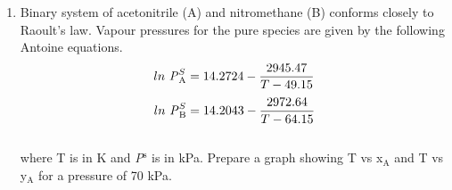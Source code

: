 \documentclass[a4paper,12pt]{report}
\begin{document}
\begin{enumerate}
    
    \item Binary system of acetonitrile (A) and nitromethane (B) conforms closely to Raoult's law. Vapour pressures for the pure species are given by the following Antoine equations.
    $$ln \  \text{\textit{P}}_\text{A}^S = 14.2724 - \frac{2945.47}{T-49.15}$$
    $$ ln \  \text{\textit{P}}_\text{B}^S = 14.2043 - \frac{2972.64}{T-64.15}$$
    \\where T is in K and \textit{P}$^\text{s}$ is in kPa. Prepare a graph showing T vs x$_\text{A}$ and T vs y$_\text{A}$ for a pressure of 70 kPa.
\end{enumerate}
\end{document}

